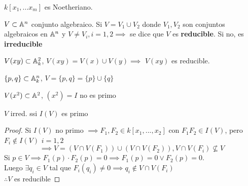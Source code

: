 \begin{cor}
    $k[x_1,...x_m]$ es Noetheriano.
\end{cor}

\begin{defn}
    $V\subset\mathbb{A}^n$ conjunto algebraico. Si $V=V_1\cup V_2$ donde $V_1,V_2$ son conjuntos algebraicos en $\mathbb{A}^n$ y $V\neq V_i, i=1,2\implies$ se dice que $V$ es \textbf{reducible}. Si no, es \textbf{irreducible}
\end{defn}

\begin{ejm}
    $V(xy)\subset\mathbb{A}^2_k$, $V(xy)=V(x)\cup V(y)\implies$ $V(xy)$  es reducible.
\end{ejm}
\begin{ejm}
    $\{p,q\}\subset\mathbb{A}_k^n$, $V=\{p,q\}=\{p\}\cup\{q\}$
\end{ejm}
\begin{ejm}
    $V(x^2)\subset\mathbb{A}^2$, $(x^2)=I$ no es primo
\end{ejm}

\begin{prop}
    $V$ irred. ssi $I(V)$ es primo
\end{prop}
\begin{proof}
    Si $I(V)$ no primo $\implies F_1,F_2\in k[x_1,...,x_2]$ con $F_1F_2\in I(V)$, pero $F_i\notin I(V)$ $i=1,2$
    \[
        \implies V=(V\cap V(F_1))\cup(V\cap V(F_2)), V\cap V(F_i)\nsubseteq V
    \]
    Si $p\in V\implies F_1(p)\cdot F_2(p)=0\implies F_1(p)=0\vee F_2(p)=0$.\\
    Luego $\exists q_i\in V$ tal que $F_i(q_i)\neq 0\implies q_i\notin V\cap V(F_i)$\\
    $\therefore V$ es reducible
\end{proof}

